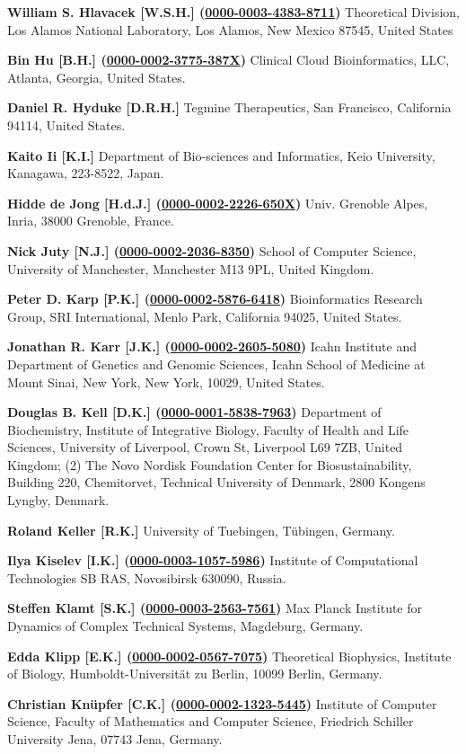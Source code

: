\documentclass{sbml-paper}
\newcommand{\orcid}[1]{\href{https://orcid.org/#1}{#1}}
\begin{document}
\textbf{William S. Hlavacek [W.S.H.] (\orcid{0000-0003-4383-8711})} Theoretical Division, Los Alamos National Laboratory, Los Alamos, New Mexico 87545, United States

\textbf{Bin Hu [B.H.] (\orcid{0000-0002-3775-387X})} Clinical Cloud Bioinformatics, LLC, Atlanta, Georgia, United States.

\textbf{Daniel R. Hyduke [D.R.H.]} Tegmine Therapeutics, San Francisco, California 94114, United States.

\textbf{Kaito Ii [K.I.]} Department of Bio-sciences and Informatics, Keio University, Kanagawa, 223-8522, Japan.

\textbf{Hidde de Jong [H.d.J.] (\orcid{0000-0002-2226-650X})} Univ. Grenoble Alpes, Inria, 38000 Grenoble, France.

\textbf{Nick Juty [N.J.] (\orcid{0000-0002-2036-8350})} School of Computer Science, University of Manchester, Manchester M13 9PL, United Kingdom.

\textbf{Peter D. Karp [P.K.] (\orcid{0000-0002-5876-6418})} Bioinformatics Research Group, SRI International, Menlo Park, California 94025, United States.

\textbf{Jonathan R. Karr [J.K.] (\orcid{0000-0002-2605-5080})} Icahn Institute and Department of Genetics and Genomic Sciences, Icahn School of Medicine at Mount Sinai, New York, New York, 10029, United States.

\textbf{Douglas B. Kell [D.K.] (\orcid{0000-0001-5838-7963})} Department of Biochemistry, Institute of Integrative Biology, Faculty of Health and Life Sciences, University of Liverpool, Crown St, Liverpool L69 7ZB, United Kingdom; (2) The Novo Nordisk Foundation Center for Biosustainability, Building 220, Chemitorvet, Technical University of Denmark, 2800 Kongens Lyngby, Denmark.

\textbf{Roland Keller [R.K.]} University of Tuebingen, Tübingen, Germany.

\textbf{Ilya Kiselev [I.K.] (\orcid{0000-0003-1057-5986})} Institute of Computational Technologies SB RAS, Novosibirsk 630090, Russia.

\textbf{Steffen Klamt [S.K.] (\orcid{0000-0003-2563-7561})} Max Planck Institute for Dynamics of Complex Technical Systems, Magdeburg, Germany.

\textbf{Edda Klipp [E.K.] (\orcid{0000-0002-0567-7075})} Theoretical Biophysics, Institute of Biology, Humboldt-Universität zu Berlin, 10099 Berlin, Germany.

\textbf{Christian Knüpfer [C.K.] (\orcid{0000-0002-1323-5445})} Institute of Computer Science, Faculty of Mathematics and Computer Science, Friedrich Schiller University Jena, 07743 Jena, Germany.
\end{document}
